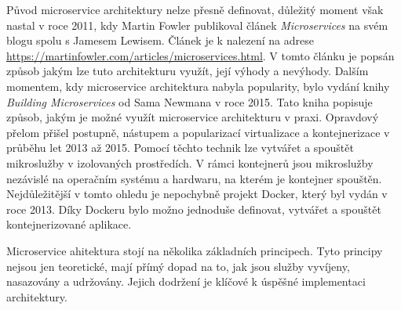 
Původ microservice architektury nelze přesně definovat, důležitý moment však nastal v roce 2011, kdy Martin Fowler publikoval článek \textit{Microservices} na svém blogu spolu s Jamesem Lewisem. Článek je k nalezení na adrese \url{https://martinfowler.com/articles/microservices.html}. V tomto článku je popsán způsob jakým lze tuto architekturu využít, její výhody a nevýhody. Dalším momentem, kdy microservice architektura nabyla popularity, bylo vydání knihy \textit{Building Microservices} od Sama Newmana v roce 2015. Tato kniha popisuje způsob, jakým je možné využít microservice architekturu v praxi. Opravdový přelom přišel postupně, nástupem a popularizací virtualizace a kontejnerizace v průběhu let 2013 až 2015. Pomocí těchto technik lze vytvářet a spouštět mikroslužby v izolovaných prostředích. V rámci kontejnerů jsou mikroslužby nezávislé na operačním systému a hardwaru, na kterém je kontejner spouštěn. Nejdůležitější v tomto ohledu je nepochybně projekt Docker, který byl vydán v roce 2013. \cite{dockerdocs} Díky Dockeru bylo možno jednoduše definovat, vytvářet a spouštět kontejnerizované aplikace. 


Microservice ahitektura stojí na několika základních principech. Tyto principy nejsou jen teoretické, mají přímý dopad na to, jak jsou služby vyvíjeny, nasazovány a udržovány. Jejich dodržení je klíčové k úspěšné implementaci architektury. \cite{Richardson2018}

